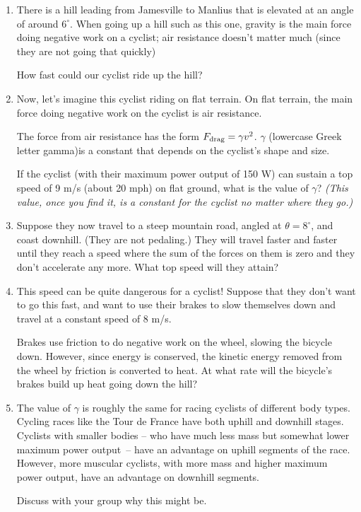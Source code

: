 \documentclass[12pt]{article}
\begin{document}
\begin{enumerate}
\item There is a hill leading from Jamesville to Manlius that is elevated at an angle of around $6^\circ$. When going up a hill such as this one, gravity is the main force doing negative work on a cyclist; air resistance doesn't matter much (since they are not going that quickly)

How fast could our cyclist ride up the hill?


\vspace{2in}

\item Now, let's imagine this cyclist riding on flat terrain. On flat terrain, the main force doing negative work on the cyclist is air resistance.

The force from air resistance has the form $F_{\rm drag} = \gamma v^2$. $\gamma$ (lowercase Greek letter gamma)is a constant that depends on the cyclist's shape and size.

If the cyclist (with their maximum power output of 150 W) can sustain a top speed of 9 m/s (about 20 mph) on flat ground, what is the value of $\gamma$? {\it (This value, once you find it, is a constant for the cyclist no matter where they go.)}

\vspace{2in}
\newpage
\item Suppose they now travel to a steep mountain road, angled at $\theta=8^\circ$, and coast downhill. (They are not pedaling.) They will travel faster and faster until they reach a speed where the sum of the forces on them is zero and they don't accelerate any more. What top speed will they attain? 

\vspace{3in}

\item This speed can be quite dangerous for a cyclist! Suppose that they don't want to go this fast, and want to use their brakes to slow themselves down and travel at a constant speed of 8 m/s.

Brakes use friction to do negative work on the wheel, slowing the bicycle down. However, since energy is conserved, the kinetic energy removed from the wheel by friction is converted to heat. At what rate will the bicycle's brakes build up heat going down the hill?

\vspace{3in}
\newpage
\item The value of $\gamma$ is roughly the same for racing cyclists of different body types. Cycling races like the Tour de France have both uphill and downhill stages. Cyclists with smaller bodies -- who have much less mass but somewhat lower maximum power output~-- have an advantage on uphill segments of the race. However, more muscular cyclists, with more mass and higher maximum power output, have an advantage on downhill segments. 

Discuss with your group why this might be.

\end{enumerate}
\end{document}
